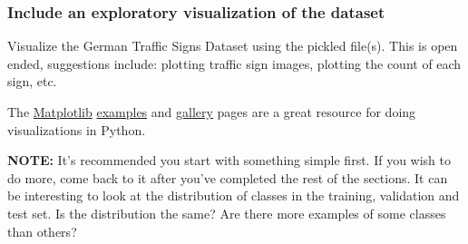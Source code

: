 \documentclass[11pt]{article}
\begin{document}
    \subsubsection{Include an exploratory visualization of the
dataset}\label{include-an-exploratory-visualization-of-the-dataset}

    Visualize the German Traffic Signs Dataset using the pickled file(s).
This is open ended, suggestions include: plotting traffic sign images,
plotting the count of each sign, etc.

The \href{http://matplotlib.org/}{Matplotlib}
\href{http://matplotlib.org/examples/index.html}{examples} and
\href{http://matplotlib.org/gallery.html}{gallery} pages are a great
resource for doing visualizations in Python.

\textbf{NOTE:} It's recommended you start with something simple first.
If you wish to do more, come back to it after you've completed the rest
of the sections. It can be interesting to look at the distribution of
classes in the training, validation and test set. Is the distribution
the same? Are there more examples of some classes than others?
\end{document}
